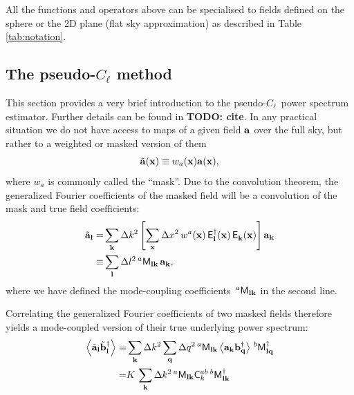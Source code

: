 \documentclass[a4paper,11pt]{article}
\newcommand{\todo}[1]{{\bf TODO: #1}}
\newcommand{\PCL}{pseudo-$C_\ell$~}
\newcommand{\summ}[1]{\sum_{\bf #1}\Delta #1^2}
\newcommand{\Ylm}[3]{{\sf E}^{#1}_{\bf #2}({\bf #3})}
\begin{document}
    All the functions and operators above can be specialised to fields defined on the sphere or the 2D plane (flat sky approximation) as described in Table \ref{tab:notation}.

  
  \subsection{The pseudo-$C_\ell$ method}\label{ssec:theory.pcl}
    This section provides a very brief introduction to the \PCL power spectrum estimator. Further details can be found in \todo{cite}. 
    In any practical situation we do not have access to maps of a given field ${\bf a}$ over the full sky, but rather to a weighted or masked version of them
    \begin{equation}
      \tilde{\bf a}({\bf x})\equiv w_a({\bf x}){\bf a}({\bf x}),
    \end{equation}
    where $w_a$ is commonly called the ``mask''. Due to the convolution theorem, the generalized Fourier coefficients of the masked field will be a convolution of the mask and true field coefficients:
    \begin{align}\nonumber
      \tilde{\bf a}_{\bf l}=&\summ{k}\left[\summ{x}\,w^a({\bf x})\,\Ylm{\dag}{l}{x}\,\Ylm{}{k}{x}\right]{\bf a}_{\bf k}\\
                      \equiv&\summ{l}\,^a{\sf M}_{{\bf l}{\bf k}}\,{\bf a}_{\bf k},
    \end{align}
    where we have defined the mode-coupling coefficients $\,^a{\sf M}_{{\bf l}{\bf k}}$ in the second line.
    
    Correlating the generalized Fourier coefficients of two masked fields therefore yields a mode-coupled version of their true underlying power spectrum:
    \begin{align}\nonumber
      \left\langle\tilde{\bf a}_{\bf l}\tilde{\bf b}^\dag_{\bf l}\right\rangle=&\summ{k}\summ{q}\,^a{\sf M}_{{\bf l}{\bf k}}\left\langle{\bf a}_{\bf k}{\bf b}^\dag_{\bf q}\right\rangle\,^b{\sf M}^\dag_{{\bf l}{\bf q}}\\
                                                                              =&K\,\summ{k}\,^a{\sf M}_{{\bf l}{\bf k}}{\sf C}^{ab}_k\,^b{\sf M}^\dag_{{\bf l}{\bf k}}
    \end{align}
    
\end{document}
